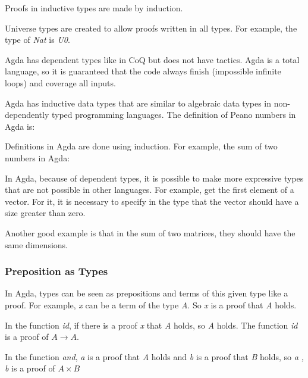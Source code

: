     Proofs in inductive types are made by induction.

    Universe types are created to allow proofs written in all types.
    For example, the type of \emph{Nat} is \emph{U0}.


Agda has dependent types like in CoQ but does not have tactics.
Agda is a total language, so it is guaranteed that the code always finish
(impossible infinite loops) and coverage all inputs.

Agda has inductive data types that are similar to algebraic data types in non-dependently
typed programming languages.
The definition of Peano numbers in Agda is:


Definitions in Agda are done using induction.
For example, the sum of two numbers in Agda:


In Agda, because of dependent types, it is possible to make more expressive types that are not
possible in other languages.
For example, get the first element of a vector.
For it, it is necessary to specify in the type that the vector should have a size greater than zero.


Another good example is that in the sum of two matrices, they should have the same dimensions.


\subsubsection{Preposition as Types}

In Agda, types can be seen as prepositions and terms of this given type like a proof.
For example, \emph{x} can be a term of the type \emph{A}.
So \emph{x} is a proof that \emph{A} holds.


In the function \emph{id},
if there is a proof \emph{x} that \emph{A} holds,
so \emph{A} holds.
The function \emph{id} is a proof of $A \rightarrow A$.


In the function \emph{and}, \emph{a} is a proof that \emph{A} holds and
\emph{b} is a proof that \emph{B} holds,
so \emph{a , b} is a proof of $A \times B$


